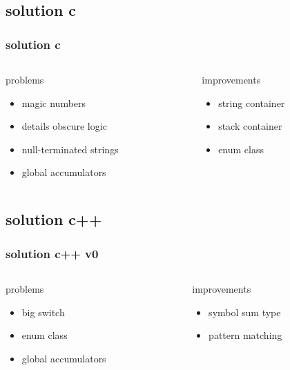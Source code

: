 \subsection{solution c}

\begin{frame}
    \frametitle{solution c}
    \begin{columns}
        \begin{column}{.48\textwidth}
            problems
            \begin{itemize}
                \item magic numbers
                \item details obscure logic
                \item null-terminated strings
                \item global accumulators
            \end{itemize}
        \end{column}
        \begin{column}{.48\textwidth}
            improvements
            \begin{itemize}
                \item string container
                \item stack container
                \item enum class
            \end{itemize}
        \end{column}
    \end{columns}
\end{frame}

\subsection{solution c++}

\begin{frame}
    \frametitle{solution c++ v0}
    \begin{columns}
        \begin{column}{.48\textwidth}
            problems
            \begin{itemize}
                \item big switch
                \item enum class
                \item global accumulators
            \end{itemize}
        \end{column}
        \begin{column}{.48\textwidth}
            improvements
            \begin{itemize}
                \item symbol sum type
                \item pattern matching
            \end{itemize}
        \end{column}
    \end{columns}
\end{frame}

